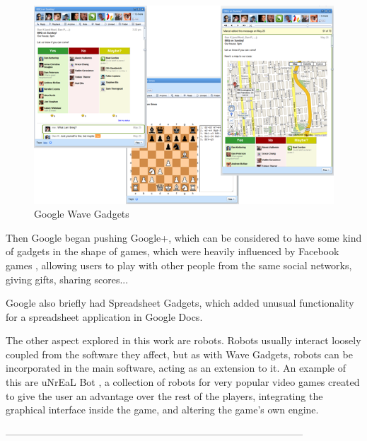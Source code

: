 \begin{figure}[h]
  \center
    \includegraphics[keepaspectratio, scale=0.5]{Media/Captures/Soa/WaveGadgets.png}
  \caption{Google Wave Gadgets}
  \label{fig:wave_gadgets}
\end{figure}

Then Google began pushing Google+, which can be considered to have some kind of gadgets in the shape of games, which were heavily influenced by Facebook games \cite{ref:facebook_games}, allowing users to play with other people from the same social networks, giving gifts, sharing scores...

Google also briefly had Spreadsheet Gadgets, which added unusual functionality for a spreadsheet application in Google Docs.

The other aspect explored in this work are robots. Robots usually interact loosely coupled from the software they affect, but as with Wave Gadgets, robots can be incorporated in the main software, acting as an extension to it. An example of this are uNrEaL Bot \cite{ref:unreal_bot}, a collection of robots for very popular video games created to give the user an advantage over the rest of the players, integrating the graphical interface inside the game, and altering the game's own engine.


\begin{center}
------------------------------------------------------------------------------------------\\
\end{center}

